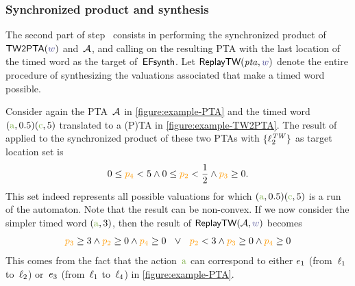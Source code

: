 \begin{tikzborder}{\cite{Gargantini16:validation}}
\begin{tikzborder}{\cite{gargantini_combinatorial_2017}}
\begin{tikzborder}{\cite{garn2019}}
\begin{tikzborder}{\cite{arcaini2019achieving}}
\begin{tikzborder}{\cite{arcaini2019varivolution}}
\begin{minipage}{0.47\textwidth}
	\label{figure:example-TW2PTA}
\end{minipage}

\subsubsection{Synchronized product and synthesis}
\begin{tikzborder}{}
The second part of step~ consists in performing the synchronized product of $\TransWord(\word)$ and~$\mathcal{A}$, and calling \EFsynth{} on the resulting PTA with the last location of the timed word as the target of~$\textsf{EFsynth}$.
%
Let $\replayTW(\ptaProc, \word)$ denote the entire procedure of synthesizing the valuations associated that make a timed word possible.

\begin{example}
	Consider again the PTA~$\mathcal{A}$ in \ref{figure:example-PTA} and the timed word $(\styleact{a}, 0.5) (\styleact{c}, 5)$ translated to a (P)TA in \ref{figure:example-TW2PTA}.
	The result of \EFsynth{} applied to the synchronized product of these two PTAs with $\{\ell^\mathit{TW}_2\}$ as target location set is
	\[0 \leq \parami{4} < 5 \land 0 \leq \parami{2} < \frac{1}{2} \land \parami{3} \geq 0\text{.}\]
	This set indeed represents all possible valuations for which $(\styleact{a}, 0.5) (\styleact{c}, 5)$ is a run of the automaton.
	Note that the result can be non-convex.
	If we now consider the simpler timed word $(\styleact{a}, 3)$, then the result of $\replayTW(\A, \word)$ becomes
	\[ \parami{3} \geq 3 \land \parami{2} \geq 0 \land \parami{4} \geq 0 \ \ \lor \ \ \parami{2} < 3 \land \parami{3} \geq 0 \land \parami{4} \geq 0 \]
	This comes from the fact that the action~$\styleact{a}$ can correspond to either $e_1$ (from~$\ell_1$ to~$\ell_2$) or~$e_3$ (from~$\ell_1$ to~$\ell_4$) in \ref{figure:example-PTA}.
\end{example}


\end{tikzborder}
\end{tikzborder}
\end{tikzborder}
\end{tikzborder}
\end{tikzborder}
\end{tikzborder}
